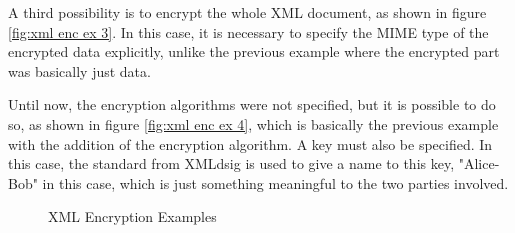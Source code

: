 A third possibility is to encrypt the whole XML document, as shown in 
figure \ref{fig:xml enc ex 3}. In this case, it is necessary to
specify the MIME type of the encrypted data explicitly, unlike the
previous example where the encrypted part was basically just data. 

Until now, the encryption algorithms were not specified, but it is 
possible to do so, as shown in figure \ref{fig:xml enc ex 4}, which is
basically the previous example with the addition of the encryption 
algorithm. A key must also be specified. In this case, the standard
from XMLdsig is used to give a name to this key, "Alice-Bob" in this
case, which is just something meaningful to the two parties involved.

\begin{figure}[H]
  \centering
  \hfill
  \hfill
  \hfill
  \caption{XML Encryption Examples}
  \label{fig:xml enc ex}
\end{figure}
